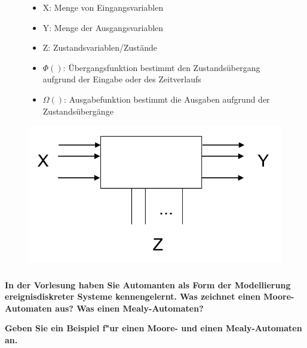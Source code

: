 \begin{figure}[H]
    \centering
    \begin{minipage}{.45\linewidth}
        \begin{itemize}
            \item X: Menge von Eingangsvariablen
            \item Y: Menge der Ausgangsvariablen
            \item Z: Zustandsvariablen/Zustände
            \item $\Phi()$: Übergangsfunktion bestimmt den Zustandsübergang aufgrund der Eingabe oder des Zeitverlaufs
            \item $\Omega()$: Ausgabefunktion bestimmt die Ausgaben aufgrund der Zustandsübergänge
        \end{itemize}
    \end{minipage}
    \begin{minipage}{.5\linewidth}
        \centering
        \includegraphics[width=.99\linewidth]{Graphics/Ereignisdiskrete_Systeme.png}
    \end{minipage}
\end{figure}

\subsubsection{}
\textbf{In der Vorlesung haben Sie Automanten als Form der Modellierung ereignisdiskreter Systeme kennengelernt. Was zeichnet einen Moore-Automaten aus? Was einen Mealy-Automaten?}

\textbf{Geben Sie ein Beispiel f"ur einen Moore- und einen Mealy-Automaten an.}

